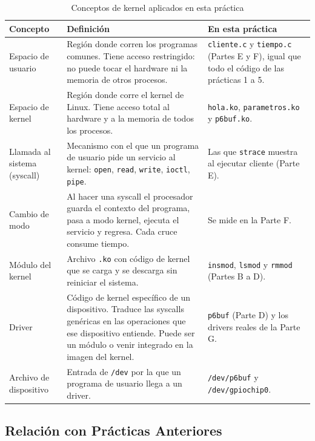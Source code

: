 \documentclass[conference]{IEEEtran}
\begin{document}
\begin{table}[H]
	\centering
	\caption{Conceptos de kernel aplicados en esta práctica}
	\label{tab:conceptos}
	\small
	\begin{tabular}{|p{2.2cm}|p{3.2cm}|p{2.2cm}|}
		\hline
		\textbf{Concepto} & \textbf{Definición} & \textbf{En esta práctica} \\
		\hline
		Espacio de usuario & Región donde corren los programas comunes. Tiene acceso restringido: no puede tocar el hardware ni la memoria de otros procesos. & \texttt{cliente.c} y \texttt{tiempo.c} (Partes E y F), igual que todo el código de las prácticas 1 a 5. \\
		\hline
		Espacio de kernel & Región donde corre el kernel de Linux. Tiene acceso total al hardware y a la memoria de todos los procesos. & \texttt{hola.ko}, \texttt{parametros.ko} y \texttt{p6buf.ko}. \\
		\hline
		Llamada al sistema (syscall) & Mecanismo con el que un programa de usuario pide un servicio al kernel: \texttt{open}, \texttt{read}, \texttt{write}, \texttt{ioctl}, \texttt{pipe}. & Las que \texttt{strace} muestra al ejecutar cliente (Parte E). \\
		\hline
		Cambio de modo & Al hacer una syscall el procesador guarda el contexto del programa, pasa a modo kernel, ejecuta el servicio y regresa. Cada cruce consume tiempo. & Se mide en la Parte F. \\
		\hline
		Módulo del kernel & Archivo \texttt{.ko} con código de kernel que se carga y se descarga sin reiniciar el sistema. & \texttt{insmod}, \texttt{lsmod} y \texttt{rmmod} (Partes B a D). \\
		\hline
		Driver & Código de kernel específico de un dispositivo. Traduce las syscalls genéricas en las operaciones que ese dispositivo entiende. Puede ser un módulo o venir integrado en la imagen del kernel. & \texttt{p6buf} (Parte D) y los drivers reales de la Parte G. \\
		\hline
		Archivo de dispositivo & Entrada de \texttt{/dev} por la que un programa de usuario llega a un driver. & \texttt{/dev/p6buf} y \texttt{/dev/gpiochip0}. \\
		\hline
	\end{tabular}
\end{table}

\subsection{Relación con Prácticas Anteriores}
\end{document}

